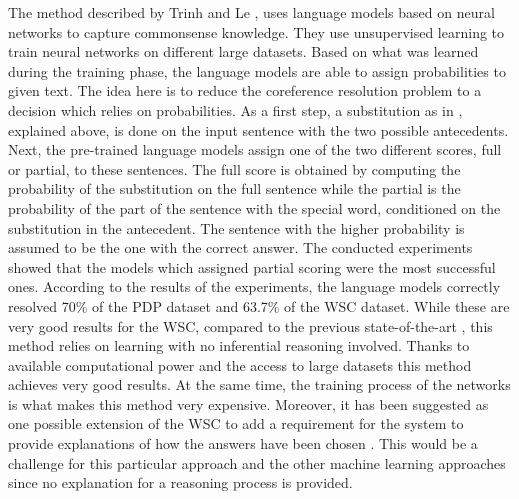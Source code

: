 The method described by Trinh and Le \cite{DBLP:journals/corr/abs-1806-02847}, uses language models based on neural networks to capture commonsense knowledge. They use unsupervised learning to train neural networks on different large datasets. Based on what was learned during the training phase, the language models are able to assign probabilities to given text. The idea here is to reduce the coreference resolution problem to a decision which relies on probabilities. As a first step, a substitution as in \cite{W18-4105}, explained above, is done on the input sentence with the two possible antecedents. Next, the pre-trained language models assign one of the two different scores, full or partial, to these sentences. The full score is obtained by computing the probability of the substitution on the full sentence while the partial is the probability of the part of the sentence with the special word, conditioned on the substitution in the antecedent. The sentence with the higher probability is assumed to be the one with the correct answer. The conducted experiments showed that the models which assigned partial scoring were the most successful ones. According to the results of the experiments, the language models correctly resolved 70\% of the PDP dataset and 63.7\% of the WSC dataset. 
While these are very good results for the WSC, compared to the previous state-of-the-art \cite{DBLP:journals/corr/LiuJLZWH16}, this method relies on learning with no inferential reasoning involved. Thanks to available computational power and the access to large datasets this method achieves very good results. At the same time, the training process of the networks is what makes this method very expensive. Moreover, it has been suggested as one possible extension of the WSC to add a requirement for the system to provide explanations of how the answers have been chosen \cite{DBLP:conf/aaai/MorgensternO15}. This would be a challenge for this particular approach and the other machine learning approaches since no explanation for a reasoning process is provided.   %


